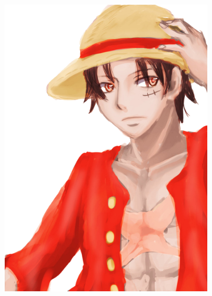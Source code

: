 \documentclass{beamer}
\begin{document}
\begin{frame}
\begin{figure}
\begin{subfigure}{0.24\textwidth}
\includegraphics[width=\textwidth]{../images/rufy_original2.png}
\end{subfigure}
\begin{subfigure}{0.24\textwidth}

\end{subfigure}
\end{figure}
\end{frame}
\end{document}
